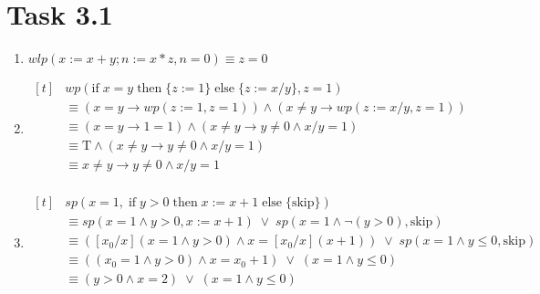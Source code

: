\documentclass{article}
\begin{document}
	\pagebreak
	
	\section{Task 3.1}
		\begin{enumerate}[label = {(\alph*)}]
			
			\item $wlp(x := x + y; n := x * z, n = 0) \equiv z = 0$
			
			\item
			$\begin{aligned}[t]
				&wp(\text{if} \; x = y \; \text{then} \; \{z := 1\} \; \text{else} \; \{z := x/y\}, z = 1) \\
				&\equiv (x = y \to wp(z := 1, z = 1)) \land (x \neq y \to wp(z := x / y, z = 1)) \\
				&\equiv (x = y \to 1 = 1) \land (x \neq y \to y \neq 0 \land x/y = 1) \\
				&\equiv \text{T} \land (x \neq y \to y \neq 0 \land x/y = 1) \\
				&\equiv x \neq y \to y \neq 0 \land x/y = 1 \\
			\end{aligned}$
			
			\item
			$\begin{aligned}[t]
				&sp(x = 1, \; \text{if} \; y > 0 \; \text{then} \; {x := x + 1} \; \text{else} \; \{\text{skip}\})\\
				&\equiv sp(x = 1 \land y > 0, x := x + 1) \; \lor \; sp(x = 1 \land \neg (y > 0), \text{skip}) \\
				&\equiv ([x_{0}/x](x = 1 \land y > 0) \land x = [x_{0}/x](x + 1)) \; \lor \; sp(x = 1 \land y \leq 0, \text{skip}) \\
				&\equiv ((x_{0} = 1 \land y > 0) \land x = x_{0} + 1) \; \lor \; (x = 1 \land y \leq 0) \\
				&\equiv (y > 0 \land x = 2) \; \lor \; (x = 1 \land y \leq 0) \\
			\end{aligned}$
			

\end{enumerate}
\end{document}
